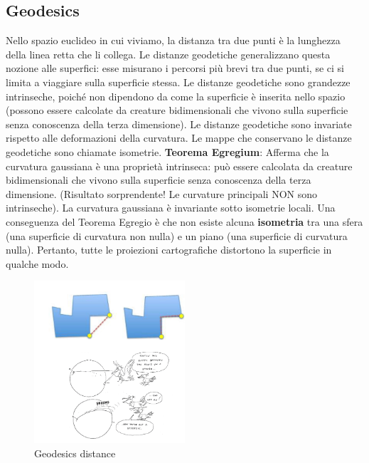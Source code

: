 \subsection{Geodesics}
Nello spazio euclideo in cui viviamo, la distanza tra due punti è la lunghezza della linea retta che li collega. Le distanze geodetiche generalizzano questa nozione alle superfici: esse misurano i percorsi più brevi tra due punti, se ci si limita a viaggiare sulla superficie stessa.
Le distanze geodetiche sono grandezze intrinseche, poiché non dipendono da come la superficie è inserita nello spazio (possono essere calcolate da creature bidimensionali che vivono sulla superficie senza conoscenza della terza dimensione).
Le distanze geodetiche sono invariate rispetto alle deformazioni della curvatura.
Le mappe che conservano le distanze geodetiche sono chiamate isometrie.
\textbf{Teorema Egregium}:
Afferma che la curvatura gaussiana è una proprietà intrinseca: può essere calcolata da creature bidimensionali che vivono sulla superficie senza conoscenza della terza dimensione.
(Risultato sorprendente! Le curvature principali NON sono intrinseche).
La curvatura gaussiana è invariante sotto isometrie locali.
Una conseguenza del Teorema Egregio è che non esiste alcuna \textbf{isometria} tra una sfera (una superficie di curvatura non nulla) e un piano (una superficie di curvatura nulla). Pertanto, tutte le proiezioni cartografiche distortono la superficie in qualche modo.
\begin{figure}[H]
    \centering
    \includegraphics[width=0.5\textwidth]{images/Geode.png} 
    \caption{Geodesics distance}
    \label{fig:immagine}
\end{figure}

